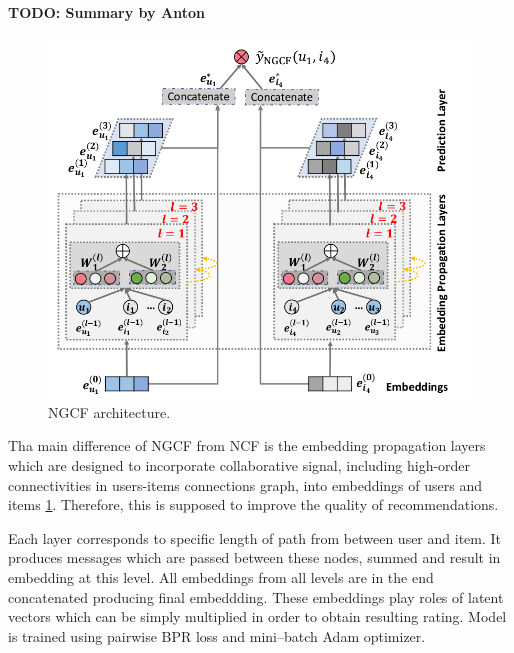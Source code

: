 \textbf{TODO: Summary by Anton}
\begin{figure}[h]
    \centering
    \includegraphics[width=0.8\linewidth]{images/ngcf.png}
    \caption{NGCF architecture.}
    \label{fig:ngcf}
\end{figure}

Tha main difference of NGCF \cite{wang2019neural} from NCF is the embedding propagation layers which are 
designed to incorporate collaborative signal, including high-order connectivities 
in users-items connections graph, into embeddings of users and items \ref{fig:ngcf}.
Therefore, this is supposed to improve the quality of recommendations. 

Each layer corresponds to specific length of path from between user and item.
It produces messages which are passed between these nodes, summed and result in
embedding at this level. All embeddings from all levels are in the end concatenated
producing final embeddding.
These embeddings play roles of latent vectors which can be simply multiplied 
in order to obtain resulting rating.
Model is trained using pairwise BPR loss and mini--batch Adam optimizer.